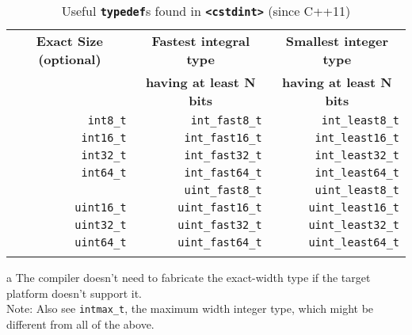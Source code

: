 \begin{table}[h!] 
\begin{center}
\begin{threeparttable} 
\caption{Useful {\bfseries\lstinline!typedef!}s found in {\bfseries \lstinline!<cstdint>!} (since
C++11)}\label{longlong-table1} \vspace{1.5ex} 
{\small \begin{tabular}{c|c|c}\thickhline 
\rowcolor[gray]{.9} {\sffamily\bfseries Exact Size (optional)\tnote{a}} & {\sffamily\bfseries Fastest integral type } & {\sffamily\bfseries Smallest integer type }\\
\rowcolor[gray]{.9}  & {\sffamily\bfseries having at least N bits} & {\sffamily\bfseries  having at least N bits}\\\hline
\multicolumn{1}{r|}{\lstinline!int8_t!} & \multicolumn{1}{r|}{\lstinline!int_fast8_t!} & \multicolumn{1}{r}{\lstinline!int_least8_t!}\\ \hline 
\multicolumn{1}{r|}{\lstinline!int16_t!} & \multicolumn{1}{r|}{\lstinline!int_fast16_t!} & \multicolumn{1}{r}{\lstinline!int_least16_t!}\\ \hline 
\multicolumn{1}{r|}{\lstinline!int32_t!} & \multicolumn{1}{r|}{\lstinline!int_fast32_t!} & \multicolumn{1}{r}{\lstinline!int_least32_t!}\\ \hline 
\multicolumn{1}{r|}{\lstinline!int64_t!} & \multicolumn{1}{r|}{\lstinline!int_fast64_t!} & \multicolumn{1}{r}{\lstinline!int_least64_t!}\\ \medhline 
\multicolumn{1}{r|}{\lstinline!uint8_t!} & \multicolumn{1}{r|}{\lstinline!uint_fast8_t!} & \multicolumn{1}{r}{\lstinline!uint_least8_t!}\\ \hline 
\multicolumn{1}{r|}{\lstinline!uint16_t!\tnote{a}} & \multicolumn{1}{r|}{\lstinline!uint_fast16_t!} & \multicolumn{1}{r}{\lstinline!uint_least16_t!}\\ \hline 
\multicolumn{1}{r|}{\lstinline!uint32_t!} & \multicolumn{1}{r|}{\lstinline!uint_fast32_t!} & \multicolumn{1}{r}{\lstinline!uint_least32_t!}\\ \hline 
\multicolumn{1}{r|}{\lstinline!uint64_t!} & \multicolumn{1}{r|}{\lstinline!uint_fast64_t!} & \multicolumn{1}{r}{\lstinline!uint_least64_t!}\\ \thickhline 
\end{tabular} } 
\begin{tablenotes}{\footnotesize   
\item[a]{The compiler doesn't need to fabricate the exact-width type if the target platform doesn't support it.\\ 
Note: Also see \lstinline!intmax_t!, the maximum width integer type, which might be different from all of the above.} 
} 
\end{tablenotes} 
\end{threeparttable} 
    \end{center}
\end{table}

